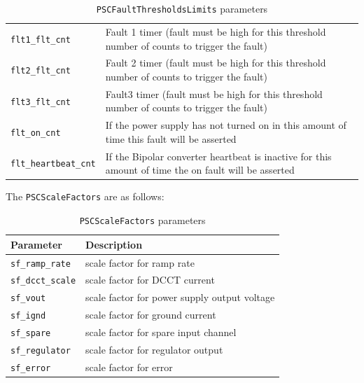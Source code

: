 \begin{table}[H]
\begin{tabular}{p{4cm}p{10cm}}
		\texttt{flt1\_flt\_cnt} &
        Fault 1 timer (fault must be high for this threshold number of counts to trigger the fault)\\

		\texttt{flt2\_flt\_cnt} &
		Fault 2 timer (fault must be high for this threshold number of counts to trigger the fault)\\

		\texttt{flt3\_flt\_cnt} &
		Fault3 timer (fault must be high for this threshold number of counts to trigger the fault)\\

		\texttt{flt\_on\_cnt} &
		If the power supply has not turned on in this amount of time this fault will be asserted\\

		\texttt{flt\_heartbeat\_cnt} &
		If the Bipolar converter heartbeat is inactive for this amount of time the on fault will be asserted\\

		\bottomrule
	\end{tabular}
	\caption{\texttt{PSCFaultThresholdsLimits} parameters}
	\label{tab:fault-limits}
\end{table}

\bigskip

The \texttt{PSCScaleFactors} are as follows:
\begin{table}[H]
	\centering
	\begin{tabular}{p{4cm}p{10cm}}
		\toprule
		\textbf{Parameter} & \textbf{Description} \\
		\midrule
		\texttt{sf\_ramp\_rate} &
		scale factor for ramp rate\\

		\texttt{sf\_dcct\_scale} &
		scale factor for DCCT current\\

		\texttt{sf\_vout} &
		scale factor for power supply output voltage\\

		\texttt{sf\_ignd} &
		scale factor for ground current\\

		\texttt{sf\_spare} &
		scale factor for spare input channel\\

		\texttt{sf\_regulator} &
		scale factor for regulator output\\
		\texttt{sf\_error} &
		scale factor for error\\

		\bottomrule
	\end{tabular}
	\caption{\texttt{PSCScaleFactors} parameters}
	\label{tab:scale-factors}
\end{table}